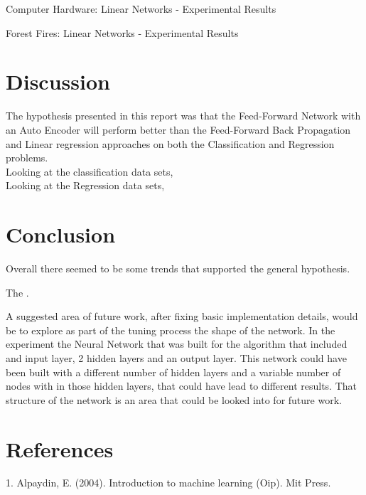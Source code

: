 \documentclass[twoside,11pt]{article}
\begin{document}
\begin{table}[h]
	\centering
	\caption{Computer Hardware: Linear Networks - Experimental Results}
	\label{tab:tale5}
\end{table}

\begin{table}[h]
	\centering
	\caption{Forest Fires: Linear Networks - Experimental Results}
	\label{tab:table6}
\end{table}

\newpage
\newpage


\section{Discussion}
\hspace*{10mm} The hypothesis presented in this report was that the  Feed-Forward Network with an Auto Encoder will perform better than the Feed-Forward Back Propagation and Linear regression approaches on both the Classification and Regression problems.\\
\hspace*{10mm} Looking at the classification data sets,  \\

\hspace*{10mm} Looking at the Regression data sets,\\


\section{Conclusion}
\hspace*{10mm} Overall there seemed to be some trends that supported the general hypothesis. \newline

\hspace*{10mm} The .\newline

\hspace*{10mm} A suggested area of future work, after fixing basic implementation details, would be to explore as part of the tuning process the shape of the network. In the experiment the Neural Network that was built for the algorithm that included and input layer, 2 hidden layers and an output layer. This network could have been built with a different number of hidden layers and a variable number of nodes with in those hidden layers, that could have lead to different results. That structure of the network is an area that could be looked into for future work. \newline

\section{References}
1. Alpaydin, E. (2004). Introduction to machine learning (Oip). Mit Press. 

\newpage
\end{document}
